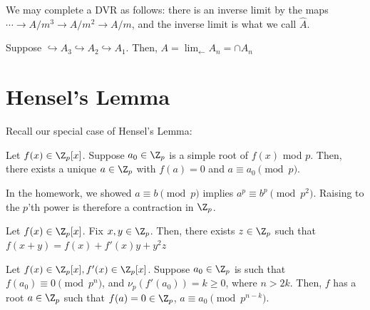 \begin{rmk}
    We may complete a DVR as follows: there is an inverse limit by the maps $\cdots \to A/m^3 \to A/m^2 \to A/m$, and the inverse limit is what we call $\hat A$.
\end{rmk}

\begin{ex}
    Suppose $\hookrightarrow A_3 \hookrightarrow A_2 \hookrightarrow A_1$. Then, $A = \lim_{\leftarrow}A_n = \cap A_n$
\end{ex}

\section{Hensel's Lemma}

Recall our special case of Hensel's Lemma:
\begin{notebox*}[Recall]
    Let $f(x) \in \Z_p[x]$. Suppose $a_0 \in \Z_p$ is a simple root of $f(x)$ mod $p$. Then, there exists a unique $a \in \Z_p$ with $f(a) = 0$ and $a \equiv a_0 \pmod p$.
\end{notebox*}

In the homework, we showed $a \equiv b \pmod {p}$ implies $a^p \equiv b^p \pmod {p^2}$. Raising to the $p$'th power is therefore a contraction in $\Z_p$.

\begin{lem}[][label=lem:taylor]
    Let $f(x) \in \Z_p[x]$. Fix $x,y\in \Z_p$. Then, there exists $z \in \Z_p$ such that $f(x+y) = f(x) + f'(x)y+y^2z$
\end{lem}

\begin{lem}
    Let $f(x) \in \Z_p[x],f'(x) \in \Z_p[x]$. Suppose $a_0 \in \Z_p$ is such that $f(a_0) \equiv 0 \pmod {p^n}$, and $\nu_p(f'(a_0)) = k \geq 0$, where $n >2k$. Then, $f$ has a root $a \in \Z_p$ such that $f(a) = 0 \in \Z_p$, $a \equiv a_0 \pmod{p^{n-k}}$.
\end{lem}


